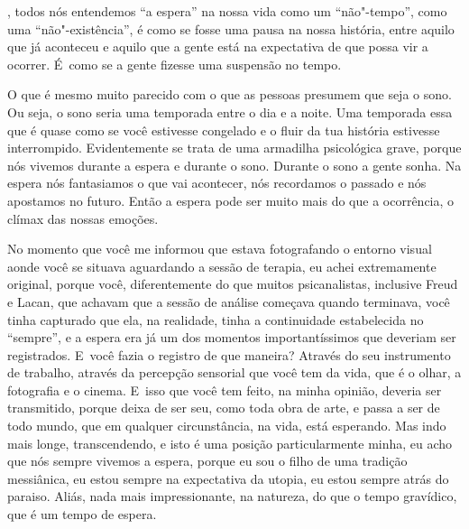  

 

, todos nós entendemos ``a espera'' na nossa vida como um
``não"-tempo'', como uma ``não"-existência'', é como se fosse uma pausa na
nossa história, entre aquilo que já aconteceu e aquilo que a gente está
na expectativa de que possa vir a ocorrer. É~como se a gente fizesse uma
suspensão no tempo.

O que é mesmo muito parecido com o que as pessoas presumem que seja o
sono. Ou seja, o sono seria uma temporada entre o dia e a noite. Uma
temporada essa que é quase como se você estivesse congelado e o fluir da
tua história estivesse interrompido. Evidentemente se trata de uma
armadilha psicológica grave, porque nós vivemos durante a espera e
durante o sono. Durante o sono a gente sonha. Na espera nós fantasiamos
o que vai acontecer, nós recordamos o passado e nós apostamos no futuro.
Então a espera pode ser muito mais do que a ocorrência, o clímax das
nossas emoções.

No momento que você me informou que estava fotografando o entorno visual
aonde você se situava aguardando a sessão de terapia, eu achei
extremamente original, porque você, diferentemente do que muitos
psicanalistas, inclusive Freud e Lacan, que achavam que a sessão de
análise começava quando terminava, você tinha capturado que ela, na
realidade, tinha a continuidade estabelecida no ``sempre'', e a espera
era já um dos momentos importantíssimos que deveriam ser registrados. E~você fazia o registro de que maneira? Através do seu instrumento de
trabalho, através da percepção sensorial que você tem da vida, que é o
olhar, a fotografia e o cinema. E~isso que você tem feito, na minha
opinião, deveria ser transmitido, porque deixa de ser seu, como toda
obra de arte, e passa a ser de todo mundo, que em qualquer
circunstância, na vida, está esperando. Mas indo mais longe,
transcendendo, e isto é uma posição particularmente minha, eu acho que
nós sempre vivemos a espera, porque eu sou o filho de uma tradição
messiânica, eu estou sempre na expectativa da utopia, eu estou sempre
atrás do paraiso. Aliás, nada mais impressionante, na natureza, do que o
tempo gravídico, que é um tempo de espera.

\begin{flushright}~\end{flushright}

